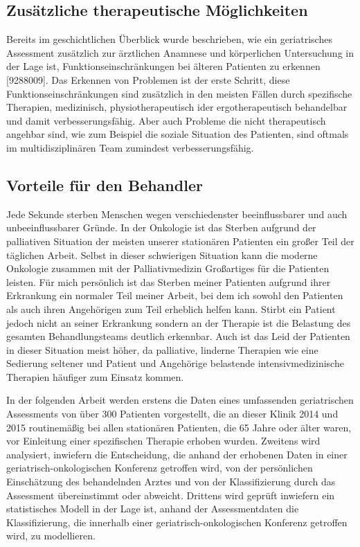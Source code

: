 \subsection{Zusätzliche therapeutische Möglichkeiten}

Bereits im geschichtlichen Überblick wurde beschrieben, wie ein geriatrisches Assessment zusätzlich zur ärztlichen Anamnese und körperlichen Untersuchung in der Lage ist, Funktionseinschränkungen bei älteren Patienten zu erkennen [9288009]. Das Erkennen von Problemen ist der erste Schritt, diese Funktionseinschränkungen sind zusätzlich in den meisten Fällen durch spezifische Therapien, medizinisch, physiotherapeutisch ider ergotherapeutisch behandelbar und damit verbesserungsfähig. Aber auch Probleme die nicht therapeutisch angehbar sind, wie zum Beispiel die soziale Situation des Patienten, sind oftmals im multidisziplinären Team zumindest verbesserungsfähig.

\subsection{Vorteile für den Behandler}

Jede Sekunde sterben Menschen wegen verschiedenster beeinflussbarer und auch unbeeinflussbarer Gründe. In der Onkologie ist das Sterben aufgrund der palliativen Situation der meisten unserer stationären Patienten ein großer Teil der täglichen Arbeit. Selbst in dieser schwierigen Situation kann die moderne Onkologie zusammen mit der Palliativmedizin Großartiges für die Patienten leisten. Für mich persönlich ist das Sterben meiner Patienten aufgrund ihrer Erkrankung ein normaler Teil meiner Arbeit, bei dem ich sowohl den Patienten als auch ihren Angehörigen zum Teil erheblich helfen kann.
Stirbt ein Patient jedoch nicht an seiner Erkrankung sondern an der Therapie ist die Belastung des gesamten Behandlungsteams deutlich erkennbar. Auch ist das Leid der Patienten in dieser Situation meist höher, da palliative, linderne Therapien wie eine Sedierung seltener und Patient und Angehörige belastende intensivmedizinische Therapien häufiger zum Einsatz kommen.

In der folgenden Arbeit werden erstens die Daten eines umfassenden
geriatrischen Assessments von über 300 Patienten vorgestellt, die an
dieser Klinik 2014 und 2015 routinemäßig bei allen stationären
Patienten, die 65 Jahre oder älter waren, vor Einleitung einer
spezifischen Therapie erhoben wurden. Zweitens wird analysiert,
inwiefern die Entscheidung, die anhand der erhobenen Daten in einer
geriatrisch-onkologischen Konferenz getroffen wird, von der
persönlichen Einschätzung des behandelnden Arztes und von der
Klassifizierung durch das Assessment übereinstimmt oder
abweicht. Drittens wird geprüft inwiefern ein statistisches Modell in
der Lage ist, anhand der Assessmentdaten die Klassifizierung, die
innerhalb einer geriatrisch-onkologischen Konferenz getroffen wird, zu
modellieren.
